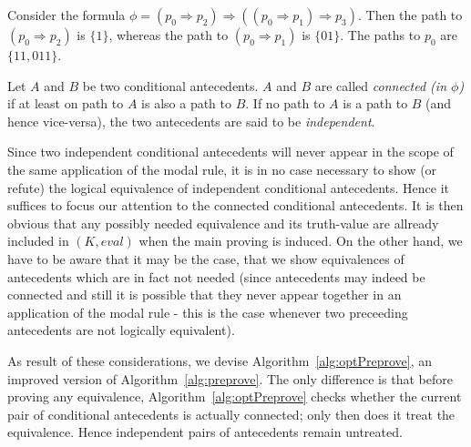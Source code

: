 \documentclass{entcs} \usepackage{entcsmacro}
\begin{document}
\begin{example}
Consider the formula $\phi=(p_0\Rightarrow p_2)\Rightarrow ((p_0\Rightarrow p_1)\Rightarrow p_3)$. Then the path to
$(p_0\Rightarrow p_2)$ is $\{1\}$, whereas the path to $(p_0\Rightarrow p_1)$ is $\{01\}$. The paths
to $p_0$ are $\{11,011\}$.
\end{example}

\begin{definition}
Let $A$ and $B$ be two conditional antecedents. $A$ and $B$ are called \emph{connected (in $\phi$)} if
at least on path to $A$ is also a path to $B$. If no path to $A$ is a path to $B$ (and hence vice-versa),
the two antecedents are said to be \emph{independent}.
\end{definition}

Since two independent conditional antecedents will never appear in the scope of the
same application of the modal rule, it is in no case necessary to show (or
refute) the logical equivalence of independent conditional antecedents. Hence it suffices to focus
our attention to the connected conditional antecedents. It is then obvious that
any possibly needed equivalence and its truth-value are allready included in $(K,eval)$
when the main proving is induced. On the other hand, we have to be aware that it
may be the case, that we show equivalences of antecedents which are in fact not needed
(since antecedents may indeed be connected and still it is possible that they never appear together in an application
of the modal rule - this is the case whenever two preceeding antecedents are not logically equivalent).

As result of these considerations, we devise Algorithm~\ref{alg:optPreprove},
an improved version of Algorithm~\ref{alg:preprove}. The only difference is
that before proving any equivalence, Algorithm~\ref{alg:optPreprove} checks
whether the current pair of conditional antecedents is actually connected;
only then does it treat the equivalence. Hence independent pairs of antecedents
remain untreated.
\end{document}
